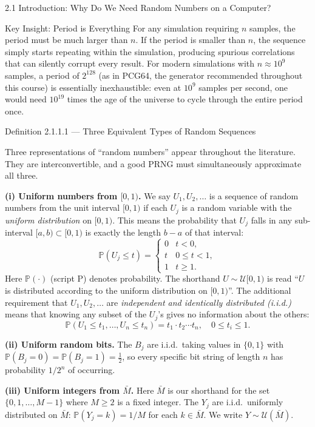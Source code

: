 \documentclass[aspectratio=169,10pt]{beamer}
\begin{document}
\begin{frame}[allowframebreaks]{2.1 Introduction: Why Do We Need Random Numbers on a Computer?}
\begin{alertblock}{Key Insight: Period is Everything}
For any simulation requiring $n$ samples, the period must be much larger than
$n$.  If the period is smaller than $n$, the sequence simply starts repeating
within the simulation, producing spurious correlations that can silently
corrupt every result.  For modern simulations with $n \approx 10^9$ samples,
a period of $2^{128}$ (as in PCG64, the generator recommended throughout this
course) is essentially inexhaustible: even at $10^9$ samples per second, one
would need $10^{19}$ times the age of the universe to cycle through the entire
period once.
\end{alertblock}

\framebreak

\begin{block}{Definition 2.1.1.1 --- Three Equivalent Types of Random Sequences}

Three representations of ``random numbers'' appear throughout the literature.
They are interconvertible, and a good PRNG must simultaneously approximate all
three.

\medskip
\textbf{(i) Uniform numbers from $[0,1)$.}  We say $U_1, U_2, \ldots$ is a
sequence of random numbers from the unit interval $[0,1)$ if each $U_j$ is a
random variable with the \emph{uniform distribution} on $[0,1)$.  This means
the probability that $U_j$ falls in any sub-interval $[a,b) \subset [0,1)$
is exactly the length $b-a$ of that interval:
\[
  \mathbb{P}(U_j \le t) =
  \begin{cases} 0 & t < 0, \\ t & 0 \le t < 1, \\ 1 & t \ge 1. \end{cases}
\]
Here $\mathbb{P}(\cdot)$ (script P) denotes probability.  The shorthand
$U \sim \mathcal{U}[0,1)$ is read ``$U$ is distributed according to the
uniform distribution on $[0,1)$''.  The additional requirement that
$U_1, U_2, \ldots$ are \emph{independent and identically distributed (i.i.d.)}
means that knowing any subset of the $U_j$'s gives no information about the
others:
\[
  \mathbb{P}(U_1 \le t_1, \ldots, U_n \le t_n) = t_1 \cdot t_2 \cdots t_n,
  \quad 0 \le t_i \le 1.
\]

\textbf{(ii) Uniform random bits.}  The $B_j$ are i.i.d.\ taking values in
$\{0,1\}$ with $\mathbb{P}(B_j = 0) = \mathbb{P}(B_j = 1) = \tfrac{1}{2}$,
so every specific bit string of length $n$ has probability $1/2^n$ of
occurring.

\textbf{(iii) Uniform integers from $\bar{M}$.}  Here $\bar{M}$ is our
shorthand for the set $\{0, 1, \ldots, M-1\}$ where $M \ge 2$ is a fixed
integer.  The $Y_j$ are i.i.d.\ uniformly distributed on $\bar{M}$:
$\mathbb{P}(Y_j = k) = 1/M$ for each $k \in \bar{M}$.  We write
$Y \sim \mathcal{U}(\bar{M})$.
\end{block}


\end{frame}
\end{document}
